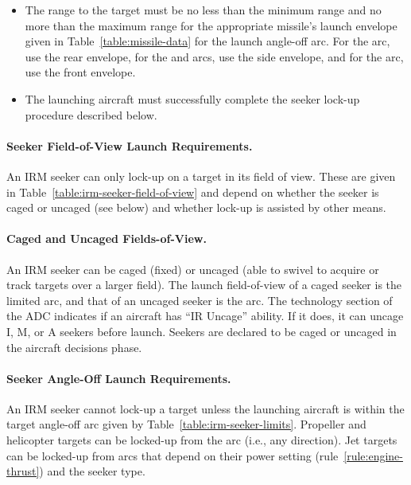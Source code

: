 {\begin{itemize}
    \item The range to the target must be no less than the minimum range and no more than the maximum range for the appropriate missile’s launch envelope given in Table~\ref{table:missile-data} for the launch angle-off arc. For the  arc, use the rear envelope, for the  and  arcs, use the side envelope, and for the  arc, use the front envelope.
    
    \item The launching aircraft must successfully complete the seeker lock-up procedure described below.
    
\end{itemize}

\paragraph{Seeker Field-of-View Launch Requirements.} 
An IRM seeker can only lock-up on a target in its field of view. These are given in Table~\ref{table:irm-seeker-field-of-view} and depend on whether the seeker is caged or uncaged (see below) and whether lock-up is assisted by other means.

\paragraph{Caged and Uncaged Fields-of-View.} \label{rule:ir-uncage} 
An IRM seeker can be caged (fixed) or uncaged (able to swivel to acquire or track targets over a larger field). The launch field-of-view of a caged seeker is the limited arc, and that of an uncaged seeker is the  arc. The technology section of the ADC indicates if an aircraft has “IR Uncage” ability. If it does, it can uncage I, M, or A seekers before launch. Seekers are declared to be caged or uncaged in the aircraft decisions phase.





\paragraph{Seeker Angle-Off Launch Requirements.} An IRM seek\-er cannot lock-up a target unless the launching aircraft is within the target angle-off arc given by Table~\ref{table:irm-seeker-limits}. Propeller and helicopter targets can be locked-up from the  arc (i.e., any direction). Jet targets can be locked-up from arcs that depend on their power setting (rule~\ref{rule:engine-thrust}) and the seeker type.

}
